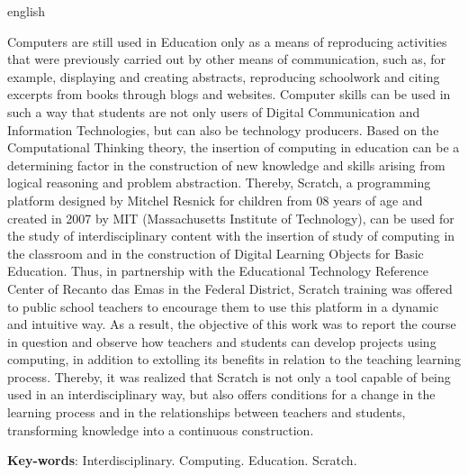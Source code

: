 \documentclass[12pt, openright, a4paper, brazil, english, french, spanish, bibjustif, openany, oneside]{abntex2}
\begin{document}
\begin{resumo}[Abstract]
 \begin{otherlanguage*}{english}

Computers are still used in Education only as a means of reproducing activities that were previously carried out by other means of communication, such as, for example, displaying and creating abstracts, reproducing schoolwork and citing excerpts from books through blogs and websites. Computer skills can be used in such a way that students are not only users of Digital Communication and Information Technologies, but can also be technology producers. Based on the Computational Thinking theory, the insertion of computing in education can be a determining factor in the construction of new knowledge and skills arising from logical reasoning and problem abstraction. Thereby, Scratch, a programming platform designed by Mitchel Resnick for children from 08 years of age and created in 2007 by MIT (Massachusetts Institute of Technology), can be used for the study of interdisciplinary content with the insertion of study of computing in the classroom and in the construction of Digital Learning Objects for Basic Education. Thus, in partnership with the Educational Technology Reference Center of Recanto das Emas in the Federal District, Scratch training was offered to public school teachers to encourage them to use this platform in a dynamic and intuitive way. As a result, the objective of this work was to report the course in question and observe how teachers and students can develop projects using computing, in addition to extolling its benefits in relation to the teaching learning process. Thereby, it was realized that Scratch is not only a tool capable of being used in an interdisciplinary way, but also offers conditions for a change in the learning process and in the relationships between teachers and students, transforming knowledge into a continuous construction.

  \vspace{\onelineskip}
 
   \noindent 
 \textbf{Key-words}: Interdisciplinary. Computing. Education. Scratch.
 \end{otherlanguage*}
\end{resumo}



\listoffigures*
\cleardoublepage

\listoftables*
\cleardoublepage
\end{document}
